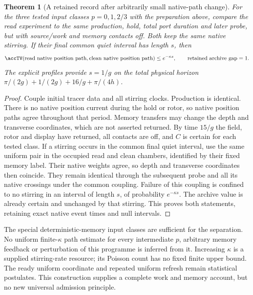 \documentclass[11pt,oneside,openany]{book}
\newtheorem{theorem}{Theorem}[chapter]
\theoremstyle{definition}
\theoremstyle{remark}\newtheorem{remark}[theorem]{Remark}
\begin{document}
\begin{theorem}[A retained record after arbitrarily small native-path change]
\label{acc:quietreturn}
For the three tested input classes $p=0,1,2/3$ with the preparation above,
compare the read experiment to the same production, hold, total port
duration and later probe, but with source/work and memory contacts off.
Both keep the same native stirring. If their final common quiet interval
has length $s$, then
\begin{equation}
 \accTV(\text{read native position path},
 \text{clean native position path})\le e^{-\kappa s},
 \qquad \text{retained archive gap}=1.
 \label{acc:quietbound}
\end{equation}
The explicit profiles provide $s=1/g$ on the total physical horizon
$\pi/(2g)+1/(2g)+16/g+\pi/(4h)$.
\end{theorem}
\begin{proof}
Couple initial tracer data and all stirring clocks. Production is identical.
There is no native position current during the hold or rotor, so native
position paths agree throughout that period. Memory transfers may change
the depth and transverse coordinates, which are not asserted returned.
By time $15/g$ the field, rotor and display have returned, all contacts
are off, and $C$ is certain for each tested class. If a stirring occurs
in the common final quiet interval, use the same uniform pair in the
occupied read and clean chambers, identified by their fixed memory label.
Their native weights agree, so depth and transverse coordinates then
coincide. They remain identical through the subsequent probe and all its
native crossings under the common coupling. Failure of this coupling is
confined to no stirring in an interval of length $s$, of probability
$e^{-\kappa s}$. The archive value is already certain and unchanged by
that stirring. This proves both statements, retaining exact native event
times and null intervals.
\end{proof}

The special deterministic-memory input classes are sufficient for the
separation. No uniform finite-$\kappa$ path estimate for every intermediate
$p$, arbitrary memory feedback or perturbation of this programme is
inferred from it. Increasing $\kappa$ is a supplied stirring-rate resource;
its Poisson count has no fixed finite upper bound. The ready uniform
coordinate and repeated uniform refresh remain statistical postulates.
This construction supplies a complete work and memory account, but no
new universal admission principle.
\end{document}
